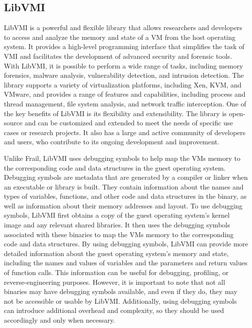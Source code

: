 \documentclass{report}
\begin{document}
\begin{spacing}{1.5}
\section{LibVMI}


{\large
LibVMI is a powerful and flexible library that allows researchers and developers to access and analyze the memory and state of a VM from the host operating system. It provides a high-level programming interface that simplifies the task of VMI and facilitates the development of advanced security and forensic tools. With LibVMI, it is possible to perform a wide range of tasks, including memory forensics, malware analysis, vulnerability detection, and intrusion detection. The library supports a variety of virtualization platforms, including Xen, KVM, and VMware, and provides a range of features and capabilities, including process and thread management, file system analysis, and network traffic interception. One of the key benefits of LibVMI is its flexibility and extensibility. The library is open-source and can be customized and extended to meet the needs of specific use cases or research projects. It also has a large and active community of developers and users, who contribute to its ongoing development and improvement.
\newline    
}

{\large
\noindent Unlike Frail, LibVMI uses debugging symbols to help map the VMs memory to the corresponding code and data structures in the guest operating system. Debugging symbols are metadata that are generated by a compiler or linker when an executable or library is built. They contain information about the names and types of variables, functions, and other code and data structures in the binary, as well as information about their memory addresses and layout. To use debugging symbols, LibVMI first obtains a copy of the guest operating system's kernel image and any relevant shared libraries. It then uses the debugging symbols associated with these binaries to map the VMs memory to the corresponding code and data structures. By using debugging symbols, LibVMI can provide more detailed information about the guest operating system's memory and state, including the names and values of variables and the parameters and return values of function calls. This information can be useful for debugging, profiling, or reverse-engineering purposes. However, it is important to note that not all binaries may have debugging symbols available, and even if they do, they may not be accessible or usable by LibVMI. Additionally, using debugging symbols can introduce additional overhead and complexity, so they should be used accordingly and only when necessary.
\newline
}



\end{spacing}
\end{document}
